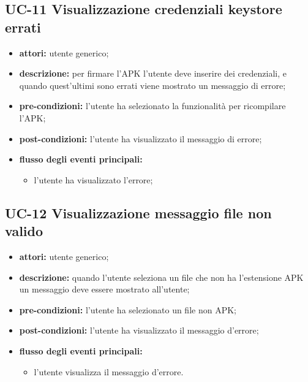 \subsection*{UC-11 Visualizzazione credenziali keystore errati}\label{subsec:uc-11-visualizzazione-credenziali-keystore-errati}
\begin{itemize}
    \item \textbf{attori:} utente generico;
    \item \textbf{descrizione:} per firmare l'APK l'utente deve inserire dei credenziali, e quando quest'ultimi sono errati viene mostrato un messaggio di errore;
    \item \textbf{pre-condizioni:} l'utente ha selezionato la funzionalità per ricompilare l'APK;
    \item \textbf{post-condizioni:} l'utente ha visualizzato il messaggio di errore;
    \item \textbf{flusso degli eventi principali:}
    \begin{itemize}
        \item l'utente ha visualizzato l'errore;
    \end{itemize}
\end{itemize}

\subsection*{UC-12 Visualizzazione messaggio file non valido}\label{subsec:uc-12-visualizzazione-messaggio-file-non-valido}
\begin{itemize}
    \item \textbf{attori:} utente generico;
    \item \textbf{descrizione:} quando l'utente seleziona un file che non ha l'estensione APK un messaggio deve essere mostrato all'utente;
    \item \textbf{pre-condizioni:} l'utente ha selezionato un file non APK;
    \item \textbf{post-condizioni:} l'utente ha visualizzato il messaggio d'errore;
    \item \textbf{flusso degli eventi principali:}
    \begin{itemize}
        \item l'utente visualizza il messaggio d'errore.
    \end{itemize}
\end{itemize}
